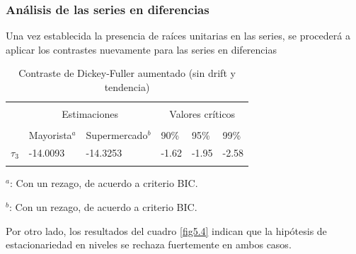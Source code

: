 \documentclass[12pt, twoside]{book}\usepackage[]{graphicx}\usepackage[]{color}
\numberwithin{equation}{section}
\numberwithin{theorem}{section}
\numberwithin{teorema}{section}
\numberwithin{defi}{section}
\numberwithin{prop}{section}
\numberwithin{defi}{section}
\theoremstyle{plain}
\begin{document}
\subsubsection{Análisis de las series en diferencias}

Una vez establecida la presencia de raíces unitarias en las series, se procederá a aplicar los contrastes nuevamente para las series en diferencias




\begin{center}
\begin{table}[h]
\caption{Contraste de Dickey-Fuller aumentado (sin drift y tendencia)\label{tab:dickey1}}
\centering
\begin{threeparttable}
\begin{tabular}{@{}llllll@{}}
\toprule \\
\multicolumn{1}{l}{} & \multicolumn{2}{c}{Estimaciones} &
\multicolumn{3}{c}{Valores críticos} \\
\cmidrule(l){2-3} \cmidrule(l){4-6} \\
\multicolumn{1}{l}{} & \multicolumn{1}{c}{Mayorista$^{a}$} &
 \multicolumn{1}{c}{Supermercado$^{b}$} &
\multicolumn{1}{l}{90\%}&
\multicolumn{1}{l}{95\%}&
\multicolumn{1}{l}{99\%}
\\
\midrule
$\tau_{3} $  &  -14.0093 &  -14.3253  & -1.62 & -1.95 & -2.58 \\
\bottomrule \\
\end{tabular}
\begin{tablenotes}
\small 
\item $^{a}$: Con un rezago, de acuerdo a criterio BIC. 
\item $^{b}$: Con un rezago, de acuerdo a criterio BIC. 
\end{tablenotes}
\end{threeparttable}
\end{table}
\end{center}



Por otro lado, los resultados del cuadro \ref{fig5.4} indican que la hipótesis de estacionariedad en niveles se rechaza fuertemente en ambos casos. 
\end{document}
